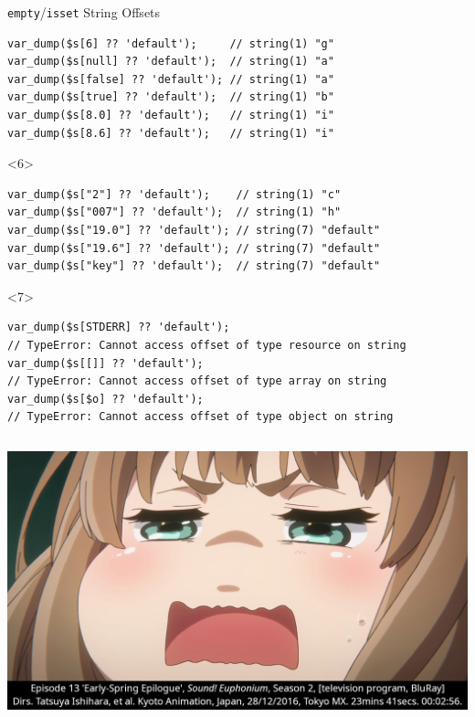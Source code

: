 \documentclass[aspectratio=169]{beamer}
\begin{document}
\begin{frame}[fragile]{\texttt{empty}/\texttt{isset} String Offsets}
\begin{onlyenv}
\begin{verbatim}
var_dump($s[6] ?? 'default');     // string(1) "g"
var_dump($s[null] ?? 'default');  // string(1) "a"
var_dump($s[false] ?? 'default'); // string(1) "a"
var_dump($s[true] ?? 'default');  // string(1) "b"
var_dump($s[8.0] ?? 'default');   // string(1) "i"
var_dump($s[8.6] ?? 'default');   // string(1) "i"
        \end{verbatim}
    \end{onlyenv}
    \begin{onlyenv}<6>
        \begin{verbatim}
var_dump($s["2"] ?? 'default');    // string(1) "c"
var_dump($s["007"] ?? 'default');  // string(1) "h"
var_dump($s["19.0"] ?? 'default'); // string(7) "default"
var_dump($s["19.6"] ?? 'default'); // string(7) "default"
var_dump($s["key"] ?? 'default');  // string(7) "default"
        \end{verbatim}
    \end{onlyenv}
    \begin{onlyenv}<7>
        \begin{verbatim}
var_dump($s[STDERR] ?? 'default');
// TypeError: Cannot access offset of type resource on string
var_dump($s[[]] ?? 'default');
// TypeError: Cannot access offset of type array on string
var_dump($s[$o] ?? 'default');
// TypeError: Cannot access offset of type object on string
        \end{verbatim}
    \end{onlyenv}
\end{frame}

\begin{frame}[plain]
  \begin{columns}[c]
    \column{\paperwidth}
    \includegraphics[width=\paperwidth, height=\paperheight]{images/00:02:56 Yuuko face Saison 2 Episode 13.jpg}
  \end{columns}
\end{frame}
\end{document}
